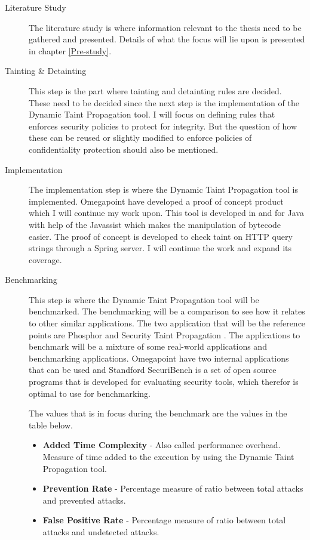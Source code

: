 \documentclass{../kththesis}
\begin{document}
\begin{description}  
	\item [Literature Study]
	The literature study is where information relevant to the thesis need to be gathered and presented. Details of what the focus will lie upon is presented in chapter \ref{Pre-study}.

	\item [Tainting \& Detainting]
	This step is the part where tainting and detainting rules are decided. These need to be decided since the next step is the implementation of the Dynamic Taint Propagation tool. I will focus on defining rules that enforces security policies to protect for integrity. But the question of how these can be reused or slightly modified to enforce policies of confidentiality protection should also be mentioned.

	\item [Implementation]
	The implementation step is where the Dynamic Taint Propagation tool is implemented. Omegapoint have developed a proof of concept product which I will continue my work upon. This tool is developed in and for Java with help of the Javassist \parencite{Javassist} which makes the manipulation of bytecode easier. The proof of concept is developed to check taint on HTTP query strings through a Spring server. I will continue the work and expand its coverage.

	\item [Benchmarking]
	This step is where the Dynamic Taint Propagation tool will be benchmarked. The benchmarking will be a comparison to see how it relates to other similar applications. The two application that will be the reference points are Phosphor \parencite{phosphor} and Security Taint Propagation \parencite{securityTaint}. The applications to benchmark will be a mixture of some real-world applications and benchmarking applications. Omegapoint have two internal applications that can be used and Standford SecuriBench \parencite{securiBench} is a set of open source programs that is developed for evaluating security tools, which therefor is optimal to use for benchmarking.
	
	The values that is in focus during the benchmark are the values in the table below. 
	
	\begin{itemize}  
		\item \textbf{Added Time Complexity} - Also called performance overhead. Measure of time added to the execution by using the Dynamic Taint Propagation tool.
		\item \textbf{Prevention Rate} - Percentage measure of ratio between total attacks and prevented attacks.
		\item \textbf{False Positive Rate} - Percentage measure of ratio between total attacks and undetected attacks.
	\end{itemize}


\end{description}
\end{document}
